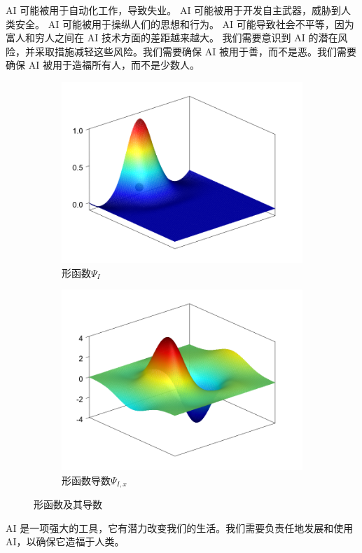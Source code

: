 \documentclass[engineeringmaster]{hquThesis}
\begin{document}
AI 可能被用于自动化工作，导致失业。
AI 可能被用于开发自主武器，威胁到人类安全。
AI 可能被用于操纵人们的思想和行为。
AI 可能导致社会不平等，因为富人和穷人之间在 AI 技术方面的差距越来越大。
我们需要意识到 AI 的潜在风险，并采取措施减轻这些风险。我们需要确保 AI 被用于善，而不是恶。我们需要确保 AI 被用于造福所有人，而不是少数人。
\begin{figure}[H]
\centering
\begin{subfigure}[b]{0.49\textwidth}
\centering
\includegraphics[width=\textwidth]{figure/1.png}
\caption{形函数$\Psi_I$}
\end{subfigure}
\hfill
\begin{subfigure}[b]{0.49\textwidth}
\centering
\includegraphics[width=\textwidth]{figure/2.png}
\caption{形函数导数$\Psi_{I,x}$}
\end{subfigure}
\caption{形函数及其导数}
\end{figure}
AI 是一项强大的工具，它有潜力改变我们的生活。我们需要负责任地发展和使用 AI，以确保它造福于人类。
\end{document}
